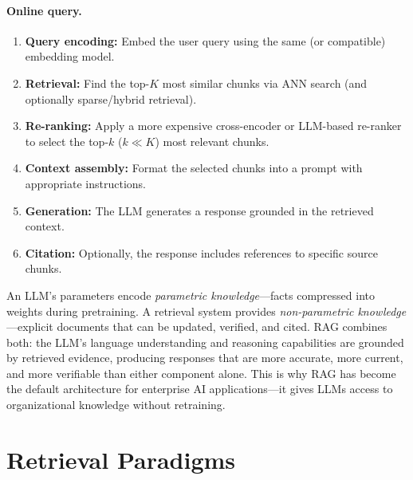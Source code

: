 \paragraph{Online query.}
\begin{enumerate}
    \item \textbf{Query encoding:} Embed the user query using the same (or
          compatible) embedding model.
    \item \textbf{Retrieval:} Find the top-$K$ most similar chunks via ANN
          search (and optionally sparse/hybrid retrieval).
    \item \textbf{Re-ranking:} Apply a more expensive cross-encoder or
          LLM-based re-ranker to select the top-$k$ ($k \ll K$) most
          relevant chunks.
    \item \textbf{Context assembly:} Format the selected chunks into a prompt
          with appropriate instructions.
    \item \textbf{Generation:} The LLM generates a response grounded in the
          retrieved context.
    \item \textbf{Citation:} Optionally, the response includes references to
          specific source chunks.
\end{enumerate}

\begin{keyinsight}
An LLM's parameters encode \emph{parametric knowledge}---facts compressed into
weights during pretraining.  A retrieval system provides \emph{non-parametric
knowledge}---explicit documents that can be updated, verified, and cited.  RAG
combines both: the LLM's language understanding and reasoning capabilities are
grounded by retrieved evidence, producing responses that are more accurate,
more current, and more verifiable than either component alone.  This is why
RAG has become the default architecture for enterprise AI applications---it
gives LLMs access to organizational knowledge without retraining.
\end{keyinsight}


\section{Retrieval Paradigms}
\label{sec:retrieval-paradigms}

